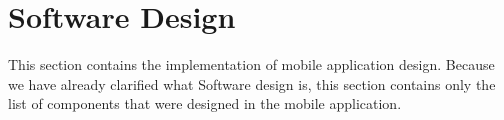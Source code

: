 \section{Software Design}\label{sec:software-design}
This section contains the implementation of mobile application design.
Because we have already clarified what Software design is, this section contains only the list of components that were designed in the mobile application.







